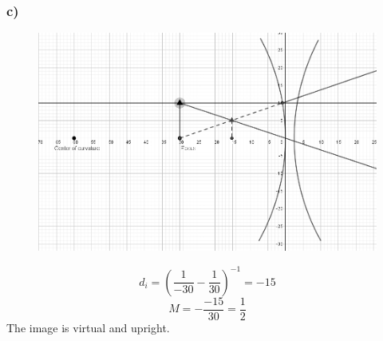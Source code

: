 \documentclass[../homework.tex]{subfiles}
\begin{document}
\subsubsection*{c)}
\begin{figure}[H]
    \centering
    \includegraphics[width=\columnwidth]{p1-c.png}
\end{figure}
\begin{equation*}
    d_i = \left(\frac{1}{-30} - \frac{1}{30}\right)^{-1} = -15
\end{equation*}
\begin{equation*}
    M = -\frac{-15}{30} = \frac{1}{2}
\end{equation*}
The image is virtual and upright.
\end{document}
